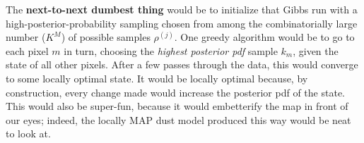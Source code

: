\documentclass[12pt, letterpaper]{article}
\begin{document}
The \textbf{next-to-next dumbest thing} would be to initialize that Gibbs run
  with a high-posterior-probability sampling chosen from among the combinatorially large
  number ($K^M$) of possible samples $\rho^{(j)}$.
One greedy algorithm would be to go to each pixel $m$ in turn,
  choosing the \emph{highest posterior pdf} sample $k_m$,
  given the state of all other pixels.
After a few passes through the data, this would converge
  to some locally optimal state.
It would be locally optimal because, by construction,
  every change made would increase the posterior pdf of the state.
This would also be super-fun, because it would embetterify the map in front of our eyes;
  indeed, the locally MAP dust model produced this way would be neat to look at.
\end{document}
